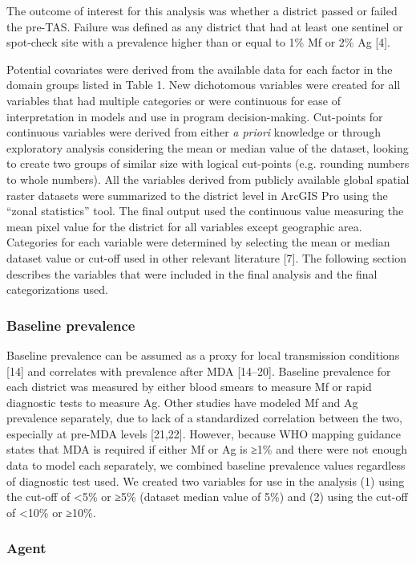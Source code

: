 \documentclass[11pt,a4paper]{article}
\begin{document}
The outcome of interest for this analysis was whether a district passed or failed the pre-TAS. Failure was defined as any district that had at least one sentinel or spot-check site with a prevalence higher than or equal to 1\% Mf or 2\% Ag [4].

Potential covariates were derived from the available data for each factor in the domain groups listed in Table 1. New dichotomous variables were created for all variables that had multiple categories or were continuous for ease of interpretation in models and use in program decision-making. Cut-points for continuous variables were derived from either \textit{a priori} knowledge or through exploratory analysis considering the mean or median value of the dataset, looking to create two groups of similar size with logical cut-points (e.g. rounding numbers to whole numbers). All the variables derived from publicly available global spatial raster datasets were summarized to the district level in ArcGIS Pro using the “zonal statistics” tool. The final output used the continuous value measuring the mean pixel value for the district for all variables except geographic area. Categories for each variable were determined by selecting the mean or median dataset value or cut-off used in other relevant literature [7]. The following section describes the variables that were included in the final analysis and the final categorizations used.

\subsubsection{Baseline prevalence}

Baseline prevalence can be assumed as a proxy for local transmission conditions [14] and correlates with prevalence after MDA [14–20]. Baseline prevalence for each district was measured by either blood smears to measure Mf or rapid diagnostic tests to measure Ag. Other studies have modeled Mf and Ag prevalence separately, due to lack of a standardized correlation between the two, especially at pre-MDA levels [21,22]. However, because WHO mapping guidance states that MDA is required if either Mf or Ag is ≥1\% and there were not enough data to model each separately, we combined baseline prevalence values regardless of diagnostic test used. We created two variables for use in the analysis (1) using the cut-off of <5\% or ≥5\% (dataset median value of 5\%) and (2) using the cut-off of <10\% or ≥10\%.

\subsubsection{Agent}
\end{document}
